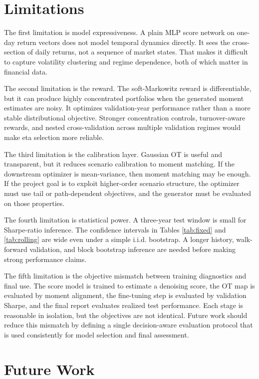 \documentclass{article}
\begin{document}
\section{Limitations}

The first limitation is model expressiveness. A plain MLP score network on
one-day return vectors does not model temporal dynamics directly. It sees the
cross-section of daily returns, not a sequence of market states. That makes it
difficult to capture volatility clustering and regime dependence, both of which
matter in financial data.

The second limitation is the reward. The soft-Markowitz reward is differentiable,
but it can produce highly concentrated portfolios when the generated moment
estimates are noisy. It optimizes validation-year performance rather than a
more stable distributional objective. Stronger concentration controls,
turnover-aware rewards, and nested cross-validation across multiple validation
regimes would make eta selection more reliable.

The third limitation is the calibration layer. Gaussian OT is useful and
transparent, but it reduces scenario calibration to moment matching. If the
downstream optimizer is mean-variance, then moment matching may be enough. If
the project goal is to exploit higher-order scenario structure, the optimizer
must use tail or path-dependent objectives, and the generator must be evaluated
on those properties.

The fourth limitation is statistical power. A three-year test window is small
for Sharpe-ratio inference. The confidence intervals in Tables \ref{tab:fixed}
and \ref{tab:rolling} are wide even under a simple i.i.d. bootstrap. A longer
history, walk-forward validation, and block bootstrap inference are needed before
making strong performance claims.

The fifth limitation is the objective mismatch between training diagnostics and
final use. The score model is trained to estimate a denoising score, the OT map
is evaluated by moment alignment, the fine-tuning step is evaluated by
validation Sharpe, and the final report evaluates realized test performance.
Each stage is reasonable in isolation, but the objectives are not identical.
Future work should reduce this mismatch by defining a single decision-aware
evaluation protocol that is used consistently for model selection and final
assessment.

\section{Future Work}
\end{document}
